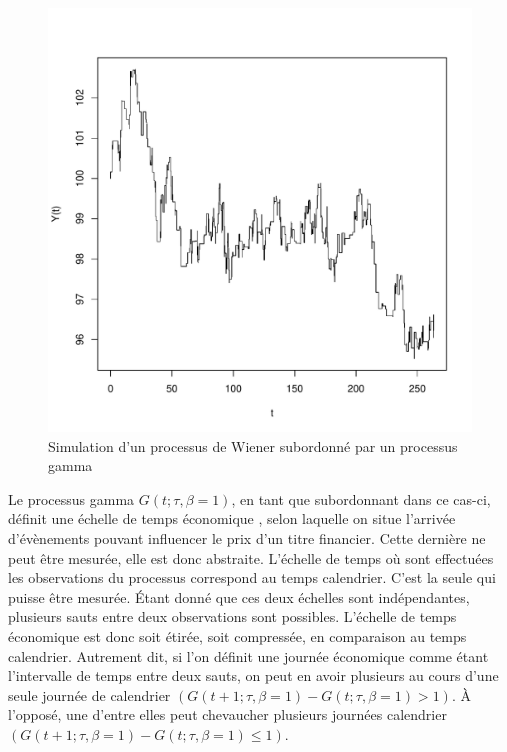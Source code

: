 \begin{figure}[!ht]
  \centering
  \includegraphics[scale=.8]{"../graphiques/CH3-SIMGAMMAGAUSS"}
  \caption{Simulation d'un processus de Wiener subordonné par un
    processus gamma}
  \label{fig:simgammagauss}
\end{figure}

Le processus gamma $G(t;\tau,\beta=1)$, en tant que subordonnant dans
ce cas-ci, définit une échelle de temps économique , selon laquelle
on situe l'arrivée d'évènements pouvant influencer le prix d'un titre
financier. Cette dernière ne peut être mesurée, elle est donc
abstraite. L'échelle de temps où sont effectuées les observations du
processus correspond au temps calendrier. C'est la seule qui
puisse être mesurée. Étant donné que ces deux échelles sont
indépendantes, plusieurs sauts entre deux observations sont possibles.
L'échelle de temps économique est donc soit étirée, soit compressée,
en comparaison au temps calendrier. Autrement dit, si l'on définit
une journée économique comme étant l'intervalle de temps entre deux
sauts, on peut en avoir plusieurs au cours d'une seule journée de
calendrier $(G(t+1;\tau,\beta=1)-G(t;\tau,\beta=1) > 1)$. À l'opposé,
une d'entre elles peut chevaucher plusieurs journées calendrier
$(G(t+1;\tau,\beta=1)-G(t;\tau,\beta=1) \leq 1)$.

